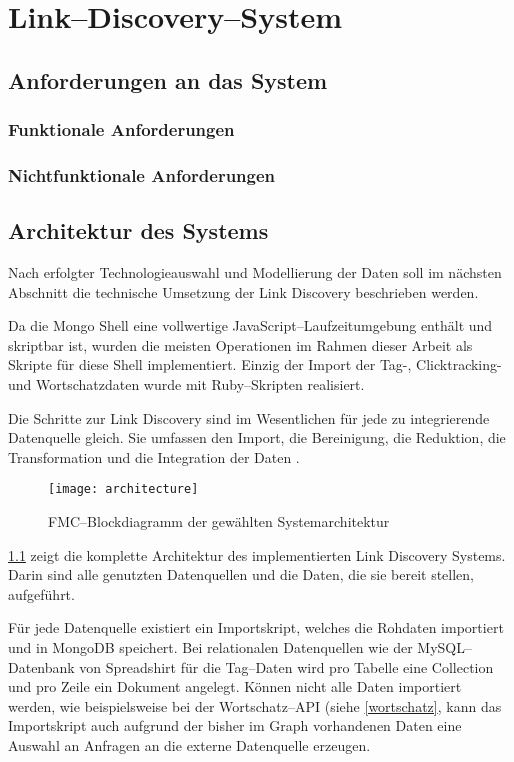 \chapter{Link--Discovery--System}
\label{system}

\section{Anforderungen an das System}

\subsection{Funktionale Anforderungen}

\subsection{Nichtfunktionale Anforderungen}

\section{Architektur des Systems}

Nach erfolgter Technologieauswahl und Modellierung der Daten soll im nächsten Abschnitt die technische Umsetzung der Link Discovery beschrieben werden.

Da die Mongo Shell eine vollwertige JavaScript--Laufzeitumgebung enthält und skriptbar ist, wurden die meisten Operationen im Rahmen dieser Arbeit als Skripte für diese Shell implementiert. Einzig der Import der Tag-, Clicktracking- und Wortschatzdaten wurde mit Ruby--Skripten realisiert.

Die Schritte zur Link Discovery sind im Wesentlichen für jede zu integrierende Datenquelle gleich. Sie umfassen den Import, die Bereinigung, die Reduktion, die Transformation und die Integration der Daten \cite{hkp2012}.

\begin{figure}
\centering
\texttt{[image: architecture]}
\caption{FMC--Blockdiagramm der gewählten Systemarchitektur}
\label{fig:architecture}
\end{figure}

\cref{fig:architecture} zeigt die komplette Architektur des implementierten Link Discovery Systems. Darin sind alle genutzten Datenquellen und die Daten, die sie bereit stellen, aufgeführt.

Für jede Datenquelle existiert ein Importskript, welches die Rohdaten importiert und in MongoDB speichert. Bei relationalen Datenquellen wie der MySQL--Datenbank von Spreadshirt für die Tag--Daten wird pro Tabelle eine Collection und pro Zeile ein Dokument angelegt. Können nicht alle Daten importiert werden, wie beispielsweise bei der Wortschatz--API (siehe \cref{wortschatz}, kann das Importskript auch aufgrund der bisher im Graph vorhandenen Daten eine Auswahl an Anfragen an die externe Datenquelle erzeugen.

